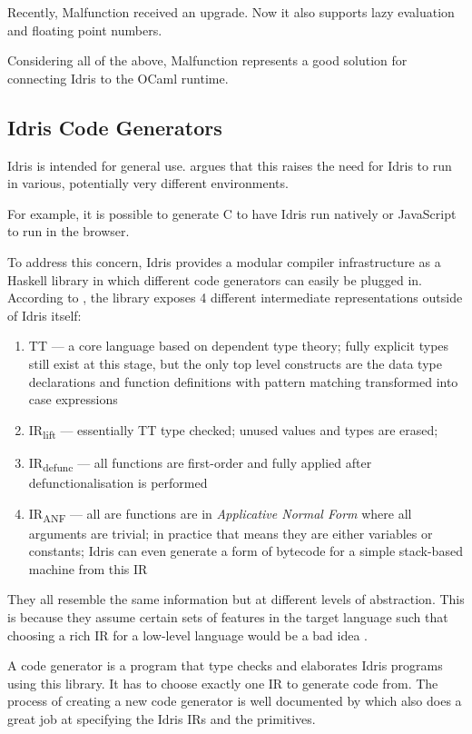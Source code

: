 Recently, Malfunction received an upgrade.
Now it also supports lazy evaluation and
floating point numbers.

Considering all of the above, Malfunction represents a good
solution for connecting Idris to the OCaml runtime.

\subsection{Idris Code Generators}
Idris is intended for general use. \citep{crosscompilers} argues
that this raises the need for Idris to run in various, potentially
very different environments.

For example, it is possible to generate C to have Idris run
natively or JavaScript to run in the browser.

To address this concern, Idris provides a modular compiler
infrastructure as a Haskell library in which different code
generators can easily be plugged in.
According to \citep{crosscompilers},
the library exposes 4 different intermediate representations outside
of Idris itself:
\begin{enumerate}
    \item TT --- a core language based on dependent type theory; fully
          explicit types still exist at this stage, but the only top level
          constructs are the data type declarations and function definitions
          with pattern matching transformed into case expressions
    \item IR\textsubscript{lift} --- essentially TT type checked; unused values
          and types are erased;
    \item IR\textsubscript{defunc} --- all functions are first-order
          and fully applied after defunctionalisation is performed
    \item IR\textsubscript{ANF} --- all are functions are in
          \emph{Applicative Normal Form} where all arguments are trivial;
          in practice that means they are either variables or constants;
          Idris can even generate a form of bytecode for a simple
          stack-based machine from this IR
\end{enumerate}
They all resemble the same information but at different levels
of abstraction. This is because they assume certain sets of features
in the target language such that choosing a rich IR
for a low-level language would be a bad idea
\citep{ElliottIdrisErlang}.


A code generator is a program that type checks and elaborates
Idris programs using this library.
It has to choose exactly one
IR to generate code from.
The process of creating a new code generator is well
documented by \citep{ElliottIdrisErlang} which also does a great job
at specifying the Idris IRs and the primitives.

